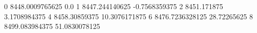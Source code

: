 0 8448.0009765625 0.0
1 8447.244140625 -0.7568359375
2 8451.171875 3.1708984375
4 8458.30859375 10.3076171875
6 8476.7236328125 28.72265625
8 8499.083984375 51.0830078125

